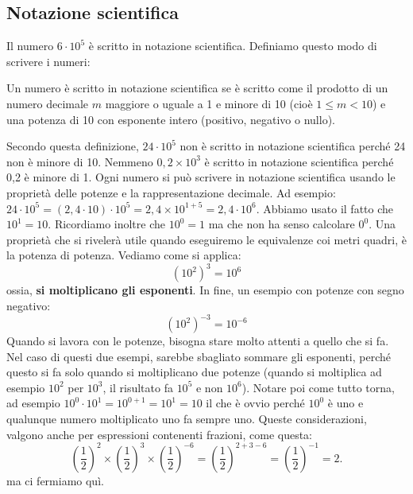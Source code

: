 \subsection{Notazione scientifica}
Il numero $6 \cdot 10^5$ è scritto in notazione scientifica. Definiamo questo modo di scrivere i numeri:
\begin{nsc}
	Un numero è scritto in notazione scientifica se è scritto come il prodotto di un numero decimale $m$ maggiore o uguale a 1 e minore di 10 (cioè $1 \le m < 10$) e una potenza di 10 con esponente intero (positivo, negativo o nullo).
\end{nsc}
Secondo questa definizione, $24 \cdot 10^5$ non è scritto in notazione scientifica perché 24 non è minore di 10. Nemmeno $0,2\times10^3$ è scritto in notazione scientifica perché 0,2 è minore di 1. Ogni numero si può scrivere in notazione scientifica usando le proprietà delle potenze e la rappresentazione decimale. Ad esempio: $24 \cdot 10^5 = (2,4\cdot10)\cdot10^5 = 2,4\times 10^{1+5}=2,4\cdot 10^6$. Abbiamo usato il fatto che $10^1 = 10$. Ricordiamo inoltre che $10^0 = 1$  ma che non ha senso calcolare $0^0$. Una proprietà che si rivelerà utile quando eseguiremo le equivalenze coi metri quadri, è la potenza di potenza. Vediamo come si applica:
\[
\left(10^2\right)^3 = 10^6
\]
ossia,  \textbf{si moltiplicano gli esponenti}. In fine, un esempio con potenze con segno negativo:
\[
\left(10^2\right)^{-3} = 10^{-6}
\]
Quando si lavora con le potenze, bisogna stare molto attenti a quello che si fa. Nel caso di questi due esempi, sarebbe sbagliato sommare gli esponenti, perché questo si fa solo quando si moltiplicano due potenze (quando si moltiplica ad esempio $10^2$ per $10^3$,  il risultato fa $10^5$ e non $10^6$). Notare poi come tutto torna, ad esempio $10^0\cdot 10^1 = 10^{0+1} =10^1 = 10$ il che è ovvio perché $10^0$ è uno e qualunque numero moltiplicato uno fa sempre uno. Queste considerazioni, valgono anche per espressioni contenenti frazioni, come questa:
\[
\left(\frac{1}{2}\right)^2\times \left(\frac{1}{2}\right)^3 \times\left(\frac{1}{2}\right)^{-6}= \left(\frac{1}{2}\right)^{2+3-6} = \left(\frac{1}{2}\right)^{-1} =2.
\]
ma ci fermiamo quì.


